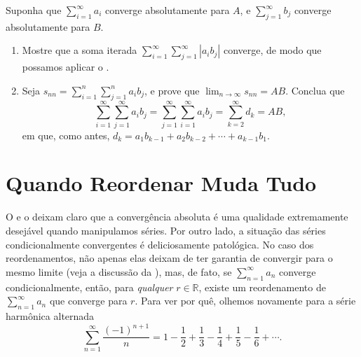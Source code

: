 \begin{exercise}\label{ex:2-8-7}
Suponha que $\sum_{i=1}^{\infty} a_i$ converge absolutamente para $A$, e $\sum_{j=1}^{\infty} b_j$ converge absolutamente para $B$.
\begin{enumerate}[label=\alph*)]
\item Mostre que a soma iterada $\sum_{i=1}^{\infty} \sum_{j=1}^{\infty} |a_i b_j|$ converge, de modo que possamos aplicar o .
\item Seja $s_{nn} = \sum_{i=1}^{n} \sum_{j=1}^{n} a_i b_j$, e prove que $\lim_{n \to \infty} s_{nn} = AB$. Conclua que
\[
\sum_{i=1}^{\infty}\sum_{j=1}^{\infty} a_i b_j
=\sum_{j=1}^{\infty}\sum_{i=1}^{\infty} a_i b_j
=\sum_{k=2}^{\infty} d_k = AB,
\]
em que, como antes, $d_k = a_1 b_{k-1} + a_2 b_{k-2} + \cdots + a_{k-1} b_1$.
\end{enumerate}
\end{exercise}


\section{Quando Reordenar Muda Tudo}\label{sec2:epilogo}

O  e o  deixam claro que a convergência absoluta é uma qualidade extremamente desejável quando manipulamos séries. Por outro lado, a situação das séries condicionalmente convergentes é deliciosamente patológica. No caso dos reordenamentos, não apenas elas deixam de ter garantia de convergir para o mesmo limite (veja a discussão da ), mas, de fato, se $\sum_{n=1}^{\infty} a_n$ converge condicionalmente, então, para \textit{qualquer} $r \in \mathbb{R}$, existe um reordenamento de $\sum_{n=1}^{\infty} a_n$ que converge para $r$. Para ver por quê, olhemos novamente para a série harmônica alternada
\[
\sum_{n=1}^{\infty} \frac{(-1)^{n+1}}{n} = 1 - \frac{1}{2} + \frac{1}{3} - \frac{1}{4} + \frac{1}{5} - \frac{1}{6} + \cdots.
\]

